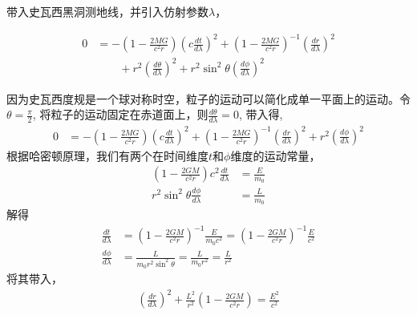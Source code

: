 带入史瓦西黑洞测地线，并引入仿射参数$\lambda$，

\begin{equation}
    \begin{split}
        0 & =-\left(1-\frac{2MG}{c^{2}r}\right)\left(c\frac{dt}{d\lambda}\right)^{2}+\left(1-\frac{2MG}{c^{2}r}\right)^{-1}\left(\frac{dr}{d\lambda}\right)^{2}\\
        & \qquad+r^{2}\left(\frac{d\theta}{d\lambda}\right)^{2}+r^{2}\sin^{2}\theta\left(\frac{d\phi}{d\lambda}\right)^{2}
    \end{split}
\end{equation}

因为史瓦西度规是一个球对称时空，粒子的运动可以简化成单一平面上的运动。令$\theta=\frac{\pi}{2}$, 将粒子的运动固定在赤道面上，则$\frac{d\theta}{d\lambda}=0$, 带入得,
\begin{equation}
    \begin{split}
        0&=-\left(1-\frac{2MG}{c^{2}r}\right)\left(c\frac{dt}{d\lambda}\right)^{2}+\left(1-\frac{2MG}{c^{2}r}\right)^{-1}\left(\frac{dr}{d\lambda}\right)^{2}+r^{2}\left(\frac{d\phi}{d\lambda}\right)^{2}
    \end{split}
\end{equation}
根据哈密顿原理，我们有两个在时间维度$t$和$\phi$维度的运动常量，
\begin{equation}
    \begin{split}
        \left(1-\frac{2GM}{c^{2}r}\right)c^{2}\frac{dt}{d\lambda}&=\frac{E}{m_{0}}\\
        r^{2}\sin^{2}\theta\frac{d\phi}{d\lambda}&=\frac{L}{m_{0}}
    \end{split}
\end{equation}
解得
\begin{equation}
    \begin{split}
        \frac{dt}{d\lambda}&=\left(1-\frac{2GM}{c^{2}r}\right)^{-1}\frac{E}{m_{0}c^{2}}=\left(1-\frac{2GM}{c^{2}r}\right)^{-1}\frac{E}{c^{2}}\\\frac{d\phi}{d\lambda}&=\frac{L}{m_{0}r^{2}\sin^{2}\theta}=\frac{L}{m_{0}r^{2}}=\frac{L}{r^{2}}
    \end{split}
\end{equation}
将其带入，
\begin{equation}
    \begin{split}
        \left(\frac{dr}{d\lambda}\right)^{2}+\frac{L^{2}}{r^{2}}\left(1-\frac{2GM}{c^{2}r}\right)=\frac{E^{2}}{c^{2}}
    \end{split}
\end{equation}
